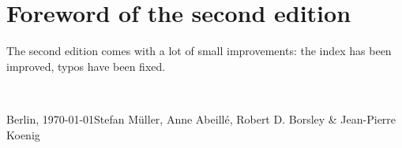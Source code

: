 \section*{Foreword of the second edition}

The second edition comes with a lot of small improvements: the index has been improved, typos have
been fixed.









~\medskip

\noindent
Berlin, \today\hfill Stefan Müller, Anne Abeillé, Robert D. Borsley \& Jean-​Pierre Koenig


